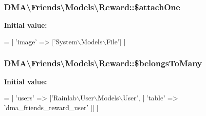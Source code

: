 \subsubsection[{\$attach\+One}]{\setlength{\rightskip}{0pt plus 5cm}D\+M\+A\textbackslash{}\+Friends\textbackslash{}\+Models\textbackslash{}\+Reward\+::\$attach\+One}\label{classDMA_1_1Friends_1_1Models_1_1Reward_ab1843b31c74161b3adcb02c7be7e9556}
{\bfseries Initial value\+:}
\begin{DoxyCode}
= [
        \textcolor{stringliteral}{'image'} => [\textcolor{stringliteral}{'System\(\backslash\)Models\(\backslash\)File'}]
    ]
\end{DoxyCode}
\hypertarget{classDMA_1_1Friends_1_1Models_1_1Reward_a4562d55136961af6257eac8242bc77a1}{}
\subsubsection[{\$belongs\+To\+Many}]{\setlength{\rightskip}{0pt plus 5cm}D\+M\+A\textbackslash{}\+Friends\textbackslash{}\+Models\textbackslash{}\+Reward\+::\$belongs\+To\+Many}\label{classDMA_1_1Friends_1_1Models_1_1Reward_a4562d55136961af6257eac8242bc77a1}
{\bfseries Initial value\+:}
\begin{DoxyCode}
= [
        \textcolor{stringliteral}{'users'} => [\textcolor{stringliteral}{'Rainlab\(\backslash\)User\(\backslash\)Models\(\backslash\)User'}, [
            \textcolor{stringliteral}{'table'} => \textcolor{stringliteral}{'dma\_friends\_reward\_user'}
        ]]
    ]
\end{DoxyCode}
\hypertarget{classDMA_1_1Friends_1_1Models_1_1Reward_a471e1042553519781408b0ebe6133397}{}
